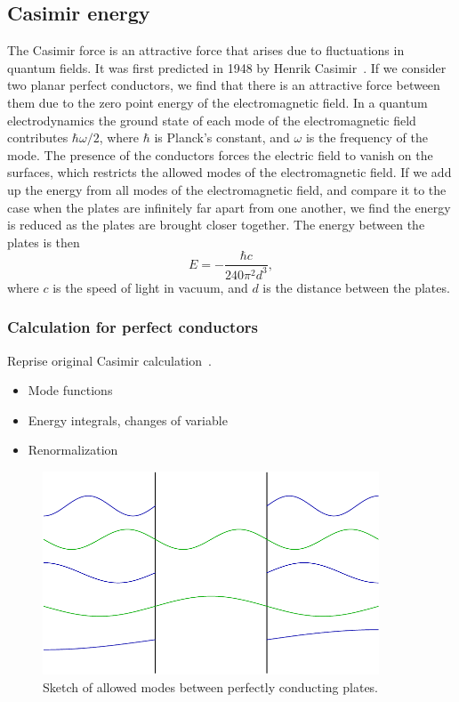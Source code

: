 \subsection{Casimir energy}

The Casimir force is an attractive force that arises due to fluctuations in quantum fields.  It was first predicted in 1948 by Henrik Casimir~\cite{Casimir1948}.  If we consider two planar perfect conductors, we find that there is an attractive force between them due to the zero point energy of the electromagnetic field.  In a quantum electrodynamics the ground state of each mode of the electromagnetic field contributes $\hbar\omega/2$, where $\hbar$ is Planck's constant, and $\omega$ is the frequency of the mode.  The presence of the conductors forces the electric field to vanish on the surfaces, which restricts the allowed modes of the electromagnetic field. If we add up the energy from all modes of the electromagnetic field, and compare it to the case when the plates are infinitely far apart from one another, we find the energy is reduced as the plates are brought closer together.  The energy between the plates is then
\begin{equation}
  E = -\frac{\hbar c}{240\pi^2 d^3},
\end{equation}
where $c$ is the speed of light in vacuum, and $d$ is the distance between the plates.

\subsubsection{Calculation for perfect conductors}

Reprise original Casimir calculation~\cite{Casimir1948}.  
\begin{itemize}
\item Mode functions
\item Energy integrals, changes of variable
\item Renormalization
\end{itemize}

\begin{figure}
\center
\includegraphics[width=10cm]{fig/intro/twoplanes_wave}
\caption{Sketch of allowed modes between perfectly conducting plates.}
\end{figure}


